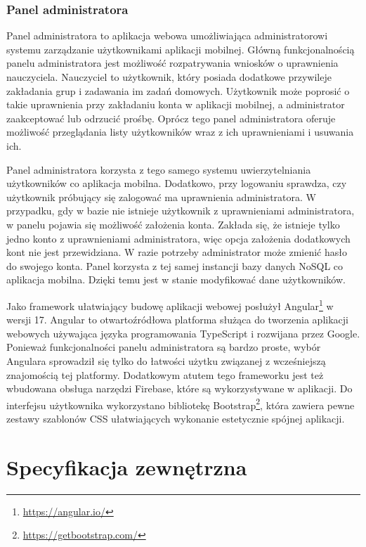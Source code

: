 \documentclass[a4paper,twoside,12pt]{book}
\begin{document}
\subsection{Panel administratora}
Panel administratora to aplikacja webowa umożliwiająca administratorowi systemu zarządzanie użytkownikami aplikacji mobilnej. Główną funkcjonalnością panelu administratora jest możliwość rozpatrywania wniosków o uprawnienia nauczyciela. Nauczyciel to użytkownik, który posiada dodatkowe przywileje zakładania grup i zadawania im zadań domowych. Użytkownik może poprosić o takie uprawnienia przy zakładaniu konta w aplikacji mobilnej, a administrator zaakceptować lub odrzucić prośbę. Oprócz tego panel administratora oferuje możliwość przeglądania listy użytkowników wraz z ich uprawnieniami i usuwania ich.

Panel administratora korzysta z tego samego systemu uwierzytelniania użytkowników co aplikacja mobilna. Dodatkowo, przy logowaniu sprawdza, czy użytkownik próbujący się zalogować ma uprawnienia administratora. W przypadku, gdy w bazie nie istnieje użytkownik z uprawnieniami administratora, w panelu pojawia się możliwość założenia konta. Zakłada się, że istnieje tylko jedno konto z uprawnieniami administratora, więc opcja założenia dodatkowych kont nie jest przewidziana. W razie potrzeby administrator może zmienić hasło do swojego konta. Panel korzysta z tej samej instancji bazy danych NoSQL co aplikacja mobilna. Dzięki temu jest w stanie modyfikować dane użytkowników. 

Jako framework ułatwiający budowę aplikacji webowej posłużył Angular\footnote{\url{https://angular.io/}} w wersji 17. Angular to otwartoźródłowa platforma służąca do tworzenia aplikacji webowych używająca języka programowania TypeScript i rozwijana przez Google. Ponieważ funkcjonalności panelu administratora są bardzo proste, wybór Angulara sprowadził się tylko do łatwości użytku związanej z wcześniejszą znajomością tej platformy. Dodatkowym atutem tego frameworku jest też wbudowana obsługa narzędzi Firebase, które są wykorzystywane w aplikacji. Do interfejsu użytkownika wykorzystano bibliotekę Bootstrap\footnote{\url{https://getbootstrap.com/}}, która zawiera pewne zestawy szablonów CSS ułatwiających wykonanie estetycznie spójnej aplikacji.

\chapter{Specyfikacja zewnętrzna}
\label{ch:04}
\end{document}
